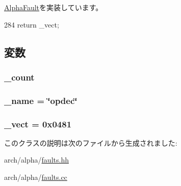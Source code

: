\hyperlink{classAlphaISA_1_1AlphaFault_ac141ef2ab527bd4d5c079ddff2e8b4aa}{AlphaFault}を実装しています。


\begin{DoxyCode}
284 {return _vect;}
\end{DoxyCode}


\subsection{変数}
\hypertarget{classAlphaISA_1_1UnimplementedOpcodeFault_a4bff925c412f331c5aaf6a39b79619ff}{
\subsubsection[{\_\-count}]{ {\bf \_\-count}}}
\label{classAlphaISA_1_1UnimplementedOpcodeFault_a4bff925c412f331c5aaf6a39b79619ff}
\hypertarget{classAlphaISA_1_1UnimplementedOpcodeFault_ac79073ffcd2c66a09bcd3bd3ad206019}{
\subsubsection[{\_\-name}]{ {\bf \_\-name} = \char`\"{}opdec\char`\"{}}}
\label{classAlphaISA_1_1UnimplementedOpcodeFault_ac79073ffcd2c66a09bcd3bd3ad206019}
\hypertarget{classAlphaISA_1_1UnimplementedOpcodeFault_ad9e5855b9db0b2824cf6c507be4a872e}{
\subsubsection[{\_\-vect}]{ {\bf \_\-vect} = 0x0481}}
\label{classAlphaISA_1_1UnimplementedOpcodeFault_ad9e5855b9db0b2824cf6c507be4a872e}


このクラスの説明は次のファイルから生成されました:\begin{DoxyCompactItemize}
\item 
arch/alpha/\hyperlink{arch_2alpha_2faults_8hh}{faults.hh}\item 
arch/alpha/\hyperlink{arch_2alpha_2faults_8cc}{faults.cc}\end{DoxyCompactItemize}
